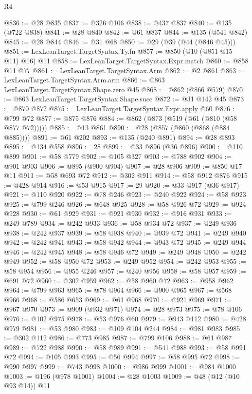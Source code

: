 \begin{lexlean}{R4}
\begin{coremodule}
@836 := @28 @835
@837 := @326 @106
@838 := @437 @837
@840 := @135 (@722 @838)
@841 := @28 @840
@842 := @61 @837
@844 := @135 (@541 @842)
@845 := @28 @844
@846 := @31 @68
@850 := @29 (@39 (@44 (@846 @45)))
@851 := LexLeanTarget.TargetSyntax.Ty.fn
@857 := @850 (@10 (@851 @15 @11) @16) @11
@858 := LexLeanTarget.TargetSyntax.Expr.match
@860 := @858 @11 @77
@861 := LexLeanTarget.TargetSyntax.Arm
@862 := @2 @861
@863 := LexLeanTarget.TargetSyntax.Arm.arm
@866 := @863 LexLeanTarget.TargetSyntax.Shape.zero @45
@868 := @862 (@866 @579)
@870 := @863 LexLeanTarget.TargetSyntax.Shape.succ
@872 := @31 @142 @45
@873 := @870 @872
@875 := LexLeanTarget.TargetSyntax.Expr.apply @60
@876 := @799 @72
@877 := @875 @876
@884 := @862 (@873 (@519 (@61 (@810 (@58 @877 @72)))))
@885 := @13 @861
@890 := @28 (@857 (@860 (@868 (@884 @885))))
@891 := @61 @202
@893 := @135 (@240 @891)
@894 := @28 @893
@895 := @134 @558
@896 := 28
@899 := @33 @896 (@36 @896)
@900 := @110 @899
@901 := @58 @779
@902 := @105 @327
@903 := @788 @902
@904 := @901 @903
@906 := @895 (@900 @904)
@907 := @28 @906
@909 := @850 @17 @11
@911 := @58 @693 @72
@912 := @302 @911
@914 := @58 @912 @876
@915 := @428 @914
@916 := @53 @915
@917 := 29
@920 := @33 @917 (@36 @917)
@921 := @110 @920
@922 := @78 @246
@923 := @240 @922
@924 := @58 @923
@925 := @799 @246
@926 := @648 @925
@928 := @58 @926 @72
@929 := @924 @928
@930 := @61 @929
@931 := @921 @930
@932 := @916 @931
@933 := @249 @789
@934 := @242 @933
@936 := @58 @934 @72
@937 := @249 @936
@938 := @242 @937
@939 := @58 @938
@940 := @939 @72
@941 := @249 @940
@942 := @242 @941
@943 := @58 @942
@944 := @943 @72
@945 := @249 @944
@946 := @242 @945
@948 := @58 @946 @72
@949 := @249 @948
@950 := @242 @949
@952 := @58 @950 @72
@953 := @249 @952
@954 := @242 @953
@955 := @58 @954
@956 := @955 @246
@957 := @240 @956
@958 := @58 @957
@959 := @691 @72
@960 := @302 @959
@962 := @58 @960 @72
@963 := @958 @962
@964 := @799 @963
@965 := @78 @964
@966 := @900 @965
@967 := @568 @966
@968 := @586 @653
@969 := @61 @968
@970 := @921 @969
@971 := @967 @970
@973 := @909 (@932 @971)
@974 := @28 @973
@975 := @78 @106
@976 := @102 @975
@978 := @53 @976 @60
@979 := @943 @112
@980 := @428 @979
@981 := @53 @980
@983 := @109 @104 @244
@984 := @981 @983
@985 := @302 @112
@986 := @773 @985
@987 := @799 @106
@988 := @61 @987
@989 := @722 @988
@990 := @58 @989
@991 := @541 @988
@993 := @58 @991 @72
@994 := @105 @993
@995 := @56 @994
@997 := @58 @995 @72
@998 := @990 @997
@999 := @743 @998
@1000 := @986 @999
@1001 := @984 @1000
@1003 := @196 (@978 @1001)
@1004 := @28 @1003
@1009 := @48 (@12 (@10 @93 @14)) @11

\end{coremodule}
\end{lexlean}
